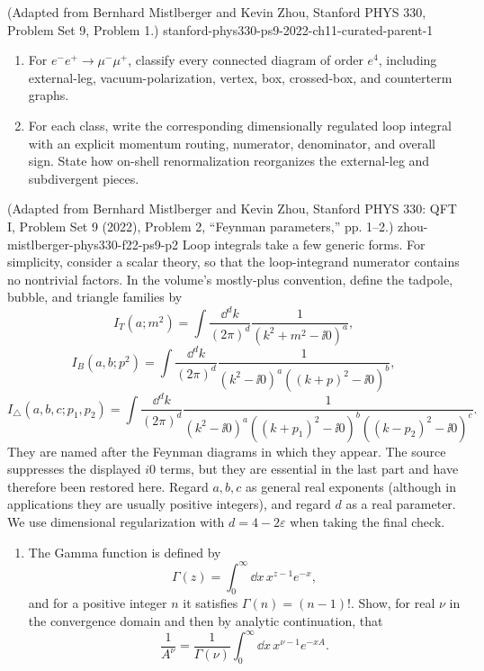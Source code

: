 
\begin{enumerate}
  {(Adapted from Bernhard Mistlberger and Kevin Zhou, Stanford PHYS 330, Problem Set 9, Problem 1.)}
  {stanford-phys330-ps9-2022-ch11-curated-parent-1}
\begin{enumerate}
\item For \(e^-e^+\to\mu^-\mu^+\), classify every connected diagram of
order \(e^4\), including external-leg, vacuum-polarization, vertex,
box, crossed-box, and counterterm graphs.
\item For each class, write the corresponding dimensionally regulated
loop integral with an explicit momentum routing, numerator, denominator,
and overall sign.  State how on-shell renormalization reorganizes the
external-leg and subdivergent pieces.
\end{enumerate}

  {(Adapted from Bernhard Mistlberger and Kevin Zhou, Stanford PHYS 330: QFT I, Problem Set 9 (2022), Problem 2, ``Feynman parameters,'' pp. 1--2.)}
  {zhou-mistlberger-phys330-f22-ps9-p2}
Loop integrals take a few generic forms.  For simplicity, consider a scalar
theory, so that the loop-integrand numerator contains no nontrivial factors.
In the volume's mostly-plus convention, define the tadpole, bubble, and
triangle families by
\[
 I_T(a;m^2)=\int\frac{\dd^dk}{(2\pi)^d}
 \frac{1}{(k^2+m^2-\ii0)^a},
 \tag{3}
\]
\[
 I_B(a,b;p^2)=\int\frac{\dd^dk}{(2\pi)^d}
 \frac{1}{(k^2-\ii0)^a((k+p)^2-\ii0)^b},
 \tag{4}
\]
\[
 I_\triangle(a,b,c;p_1,p_2)=\int\frac{\dd^dk}{(2\pi)^d}
 \frac{1}{(k^2-\ii0)^a((k+p_1)^2-\ii0)^b
 ((k-p_2)^2-\ii0)^c}.
 \tag{5}
\]
They are named after the Feynman diagrams in which they appear.  The source
suppresses the displayed \(i0\) terms, but they are essential in the last
part and have therefore been restored here.  Regard \(a,b,c\) as general
real exponents (although in applications they are usually positive
integers), and regard \(d\) as a real parameter.  We use dimensional
regularization with \(d=4-2\varepsilon\) when taking the final check.
\begin{enumerate}
\item
The Gamma function is defined by
\[
 \Gamma(z)=\int_0^\infty \dd x\,x^{z-1}e^{-x},
 \tag{6}
\]
and for a positive integer \(n\) it satisfies
\(\Gamma(n)=(n-1)!\).  Show, for real \(\nu\) in the convergence domain and
then by analytic continuation, that
\[
 \frac{1}{A^\nu}=\frac{1}{\Gamma(\nu)}
 \int_0^\infty \dd x\,x^{\nu-1}e^{-xA}.
 \tag{7}
\]


\end{enumerate}
\end{enumerate}
